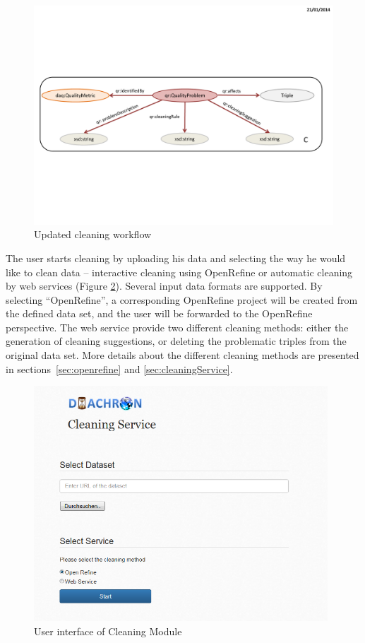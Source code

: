 \begin{figure}[ht!]
\centering
\includegraphics[page=6,trim=0.5cm 4.5cm 2.5cm 0.5cm,clip,width=\textwidth]{figures/CleaningFigures.pdf}
\caption{Updated cleaning workflow}
\label{fig:workflow}
\end{figure}

The user starts cleaning by uploading his data and selecting the way he would like to clean data – interactive cleaning using OpenRefine or automatic cleaning by web services (Figure \ref{fig:entry}).
Several input data formats are supported.
By selecting “OpenRefine”, a corresponding OpenRefine project will be created from the defined data set, and the user will be forwarded to the OpenRefine perspective.
The web service provide two different cleaning methods: either the generation of cleaning suggestions, or deleting the problematic triples from the original data set.
More details about the different cleaning methods are presented in sections~\ref{sec:openrefine} and \ref{sec:cleaningService}.

\begin{figure}[ht!]
\centering
\includegraphics[width=11cm]{figures/CleaningStartPage.PNG}
\caption{User interface of Cleaning Module}
\label{fig:entry}
\end{figure}


